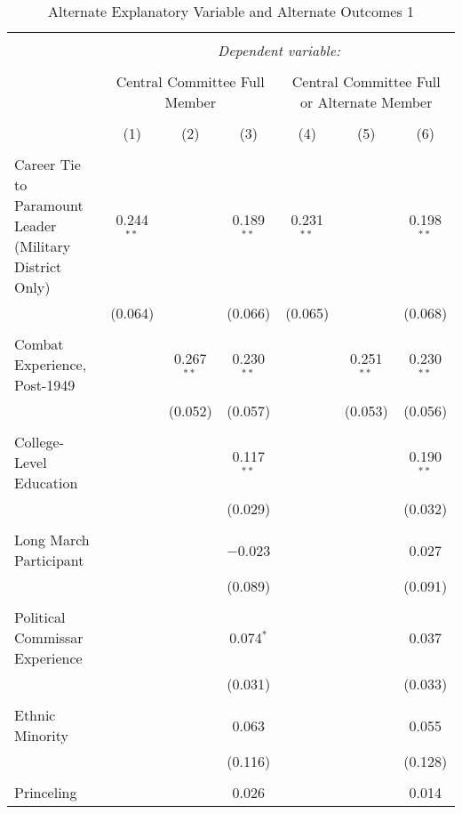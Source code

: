 
\begin{table}[!htbp] \centering 
  \caption{Alternate Explanatory Variable and Alternate Outcomes 1} 
  \label{table_a6} 
\begin{tabular}{@{\extracolsep{5pt}}lcccccc} 
\\[-1.8ex]\hline 
\hline \\[-1.8ex] 
 & \multicolumn{6}{c}{\textit{Dependent variable:}} \\ 
\cline{2-7} 
\\[-1.8ex] & \multicolumn{3}{c}{Central Committee Full Member} & \multicolumn{3}{c}{Central Committee Full or Alternate Member} \\ 
\\[-1.8ex] & (1) & (2) & (3) & (4) & (5) & (6)\\ 
\hline \\[-1.8ex] 
 Career Tie to Paramount Leader (Military District Only) & 0.244$^{**}$ &  & 0.189$^{**}$ & 0.231$^{**}$ &  & 0.198$^{**}$ \\ 
  & (0.064) &  & (0.066) & (0.065) &  & (0.068) \\ 
  & & & & & & \\ 
 Combat Experience, Post-1949 &  & 0.267$^{**}$ & 0.230$^{**}$ &  & 0.251$^{**}$ & 0.230$^{**}$ \\ 
  &  & (0.052) & (0.057) &  & (0.053) & (0.056) \\ 
  & & & & & & \\ 
 College-Level Education &  &  & 0.117$^{**}$ &  &  & 0.190$^{**}$ \\ 
  &  &  & (0.029) &  &  & (0.032) \\ 
  & & & & & & \\ 
 Long March Participant &  &  & $-$0.023 &  &  & 0.027 \\ 
  &  &  & (0.089) &  &  & (0.091) \\ 
  & & & & & & \\ 
 Political Commissar Experience &  &  & 0.074$^{*}$ &  &  & 0.037 \\ 
  &  &  & (0.031) &  &  & (0.033) \\ 
  & & & & & & \\ 
 Ethnic Minority &  &  & 0.063 &  &  & 0.055 \\ 
  &  &  & (0.116) &  &  & (0.128) \\ 
  & & & & & & \\ 
 Princeling &  &  & 0.026 &  &  & 0.014 \\ 

\end{tabular}
\end{table}
